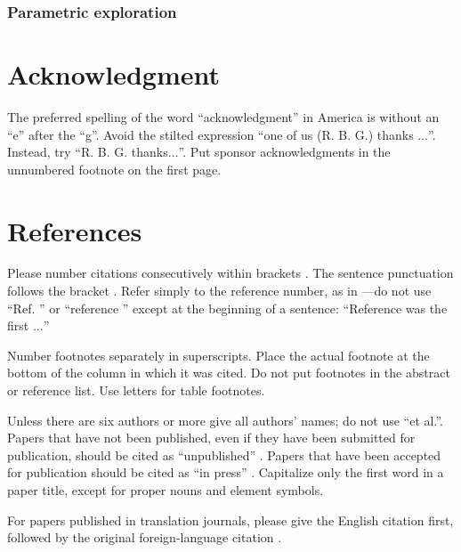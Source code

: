 \documentclass[conference]{IEEEtran}
\begin{document}
\subsubsection{Parametric exploration}

\section*{Acknowledgment}

The preferred spelling of the word ``acknowledgment'' in America is without 
an ``e'' after the ``g''. Avoid the stilted expression ``one of us (R. B. 
G.) thanks $\ldots$''. Instead, try ``R. B. G. thanks$\ldots$''. Put sponsor 
acknowledgments in the unnumbered footnote on the first page.

\section*{References}

Please number citations consecutively within brackets \cite{b1}. The 
sentence punctuation follows the bracket \cite{b2}. Refer simply to the reference 
number, as in \cite{b3}---do not use ``Ref. \cite{b3}'' or ``reference \cite{b3}'' except at 
the beginning of a sentence: ``Reference \cite{b3} was the first $\ldots$''

Number footnotes separately in superscripts. Place the actual footnote at 
the bottom of the column in which it was cited. Do not put footnotes in the 
abstract or reference list. Use letters for table footnotes.

Unless there are six authors or more give all authors' names; do not use 
``et al.''. Papers that have not been published, even if they have been 
submitted for publication, should be cited as ``unpublished'' \cite{b4}. Papers 
that have been accepted for publication should be cited as ``in press'' \cite{b5}. 
Capitalize only the first word in a paper title, except for proper nouns and 
element symbols.

For papers published in translation journals, please give the English 
citation first, followed by the original foreign-language citation \cite{b6}.
\end{document}
